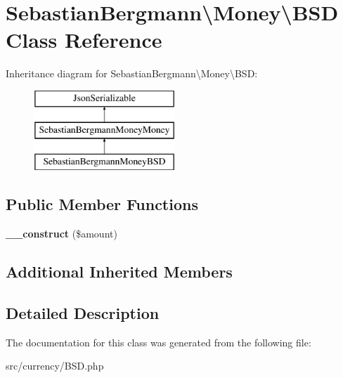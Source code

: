 \hypertarget{classSebastianBergmann_1_1Money_1_1BSD}{}\section{Sebastian\+Bergmann\textbackslash{}Money\textbackslash{}B\+S\+D Class Reference}
\label{classSebastianBergmann_1_1Money_1_1BSD}
Inheritance diagram for Sebastian\+Bergmann\textbackslash{}Money\textbackslash{}B\+S\+D\+:\begin{figure}[H]
\begin{center}
\leavevmode
\includegraphics[height=3.000000cm]{classSebastianBergmann_1_1Money_1_1BSD}
\end{center}
\end{figure}
\subsection*{Public Member Functions}
\begin{DoxyCompactItemize}
\item 
\hypertarget{classSebastianBergmann_1_1Money_1_1BSD_a43b83d0ad6518cd5766357d6df891cd8}{}{\bfseries \+\_\+\+\_\+construct} (\$amount)\label{classSebastianBergmann_1_1Money_1_1BSD_a43b83d0ad6518cd5766357d6df891cd8}

\end{DoxyCompactItemize}
\subsection*{Additional Inherited Members}


\subsection{Detailed Description}


The documentation for this class was generated from the following file\+:\begin{DoxyCompactItemize}
\item 
src/currency/B\+S\+D.\+php\end{DoxyCompactItemize}
